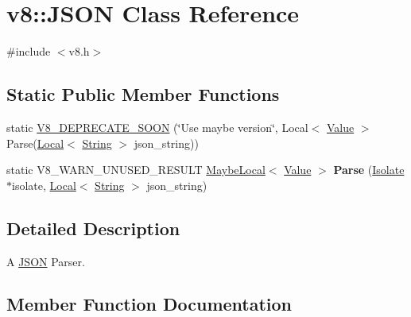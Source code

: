 \hypertarget{classv8_1_1JSON}{}\section{v8\+:\+:J\+S\+O\+N Class Reference}
\label{classv8_1_1JSON}


{\ttfamily \#include $<$v8.\+h$>$}

\subsection*{Static Public Member Functions}
\begin{DoxyCompactItemize}
\item 
static \hyperlink{classv8_1_1JSON_a49d405ef7c6adbf476698d23380613fc}{V8\+\_\+\+D\+E\+P\+R\+E\+C\+A\+T\+E\+\_\+\+S\+O\+O\+N} (\char`\"{}Use maybe version\char`\"{}, Local$<$ \hyperlink{classv8_1_1Value}{Value} $>$ Parse(\hyperlink{classv8_1_1Local}{Local}$<$ \hyperlink{classv8_1_1String}{String} $>$ json\+\_\+string))
\item 
\hypertarget{classv8_1_1JSON_ac459be02a86db2d1a7fb67ddd72023c0}{}static V8\+\_\+\+W\+A\+R\+N\+\_\+\+U\+N\+U\+S\+E\+D\+\_\+\+R\+E\+S\+U\+L\+T \hyperlink{classv8_1_1MaybeLocal}{Maybe\+Local}$<$ \hyperlink{classv8_1_1Value}{Value} $>$ {\bfseries Parse} (\hyperlink{classv8_1_1Isolate}{Isolate} $\ast$isolate, \hyperlink{classv8_1_1Local}{Local}$<$ \hyperlink{classv8_1_1String}{String} $>$ json\+\_\+string)\label{classv8_1_1JSON_ac459be02a86db2d1a7fb67ddd72023c0}

\end{DoxyCompactItemize}


\subsection{Detailed Description}
A \hyperlink{classv8_1_1JSON}{J\+S\+O\+N} Parser. 

\subsection{Member Function Documentation}
\hypertarget{classv8_1_1JSON_a49d405ef7c6adbf476698d23380613fc}{}
